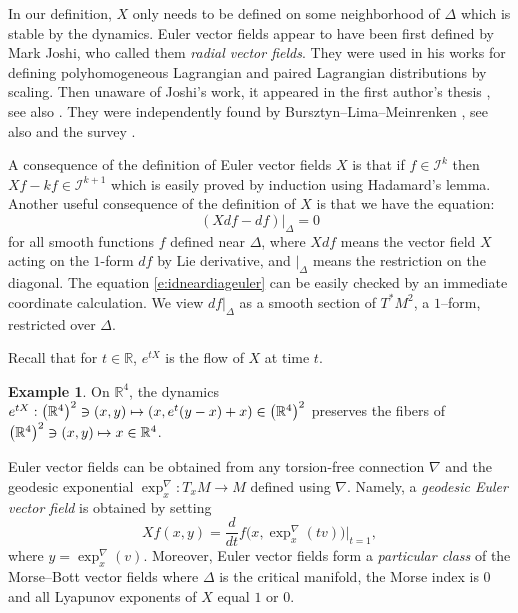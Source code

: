 \documentclass[10pt]{amsart}
\let\pazocal\mathscr
\def\mto{\mathchoice{\longmapsto}{\mapsto}{\mapsto}{\mapsto}}
\theoremstyle{definition}
\newtheorem{example}[theorem]{Example}
\newcommand\rr{{\mathbb R}}
\let\euler X
\begin{document}
In our definition, $\euler$ only needs to be defined on some neighborhood of $\Delta$ which is stable by the dynamics.
Euler vector fields appear to have been first defined by Mark Joshi, who called them \emph{radial vector fields}. They were used in his works \cite{10.2307/2162103,Joshi1998} for defining polyhomogeneous Lagrangian and paired Lagrangian distributions by scaling. Then unaware of Joshi's work, it appeared in the first author's thesis \cite{dangthesis}, see also \cite[Def.\,1.1]{DangAHP}. They were independently found by Bursztyn--Lima--Meinrenken \cite{Bursztyn2019}, see also \cite{Bischo2020} and the survey \cite{Meinrenken2021}.

A consequence of the definition of Euler vector fields $\euler$ is that
if $f\in \pazocal{I}^k$ then $\euler f-kf\in \pazocal{I}^{k+1}$ which is
easily proved by induction using Hadamard's lemma.
Another useful consequence of the definition of $\euler$ is that
we have the equation:
\begin{equation}\label{e:idneardiageuler}
\left(Xdf-df\right)|_{\Delta}=0
\end{equation}
for all smooth functions $f$ defined near $\Delta$, where $\euler df$ means the vector field $\euler$ acting on the $1$-form $df$ by Lie derivative, and $|_\Delta$ means the restriction on the diagonal.
The equation \eqref{e:idneardiageuler} can be easily checked by an immediate coordinate calculation.
We view $df|_\Delta$ as a smooth section of $T^*M^2$, a $1$--form, restricted over $\Delta$.

Recall that for $t\in \rr$, $e^{t\euler}$ is the flow of $\euler$ at time $t$.

\begin{example}
On $\mathbb{R}^4$, the dynamics $ e^{t\euler}: \left(\mathbb{R}^4\right)^2\ni(x,y) \mto (x,e^{t}(y-x)+x)\in \left(\mathbb{R}^4\right)^2 $ preserves
the fibers of $\left(\mathbb{R}^4\right)^2 \ni (x,y)\mto x\in \mathbb{R}^4$.
\end{example}

Euler vector fields can be obtained from any torsion-free connection $\nabla$ and the geodesic exponential $\exp_x^\nabla:T_xM\to M$ defined using $\nabla$.
Namely, a \emph{geodesic Euler vector field} is obtained by setting
\[
\euler f(x,y)=\frac{d}{dt}f\big(x,\exp^\nabla_x(tv)\big)|_{t=1},
\]
where $y=\exp_x^\nabla(v)$. Moreover, Euler vector fields form a \emph{particular class} of the Morse--Bott vector fields
where $\Delta$ is the critical manifold, the Morse index is $0$ and all Lyapunov exponents of $\euler$ equal $1$ or $0$.
\end{document}
